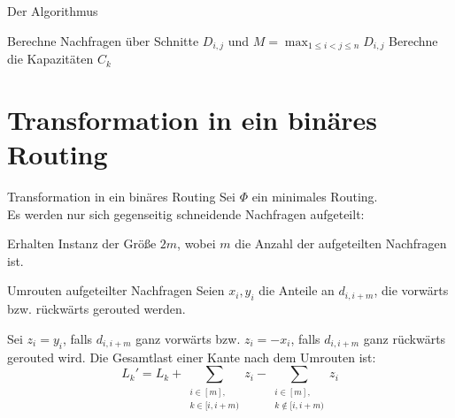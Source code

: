 \documentclass[8pt]{beamer}
\newcommand{\N}{\mathbb{N}}
\theoremstyle{claim}
\begin{document}
	\begin{frame}{Der Algorithmus}
		\begin{center}
			\begin{algorithm}[H]
				\begin{mdframed}[backgroundcolor=green!10,linecolor=white]
					\KwIn{Ring size $n \in \N$, demands $d_{i,j}$, $1 \leq i < j \leq n$.}
					\nl Berechne Nachfragen über Schnitte $D_{i, j}$ und $M = \max_{1 \leq i < j \leq n} D_{i,j}$\;
					\nl Berechne die Kapazitäten $C_k$\;
					\nl{}
					\nl{}
				\end{mdframed}
			\end{algorithm}
		\end{center}
	\end{frame}

	\section{Transformation in ein binäres Routing}
	\begin{frame}{Transformation in ein binäres Routing}
		Sei $\Phi$ ein minimales Routing.\\
		Es werden nur sich gegenseitig schneidende Nachfragen aufgeteilt:
		\vspace{5mm}
		\begin{center}
				
		\end{center}
		\vspace{5mm}
		Erhalten Instanz der Größe $2m$, wobei $m$ die Anzahl der aufgeteilten Nachfragen ist.
	\end{frame}

	\begin{frame}{Umrouten aufgeteilter Nachfragen}
		Seien $x_i, y_i$ die Anteile an $d_{i, i+m}$, die vorwärts bzw. rückwärts gerouted werden.
		\vspace{5mm}
		\begin{center}
			
		\end{center}
		\vspace{5mm}
		Sei $z_i = y_i$, falls $d_{i, i+m}$ ganz vorwärts bzw. $z_i = -x_i$, falls $d_{i, i+m}$ ganz rückwärts gerouted wird.\pause
		Die Gesamtlast einer Kante nach dem Umrouten ist:
		\begin{equation}
			L_k' = L_k + \sum_{\substack{i \in [m],\\ k \in [i, i+m)}} z_i - \sum_{\substack{i \in [m],\\ k \notin[i, i+m)}} z_i
		\end{equation}
	
	\end{frame}
\end{document}
